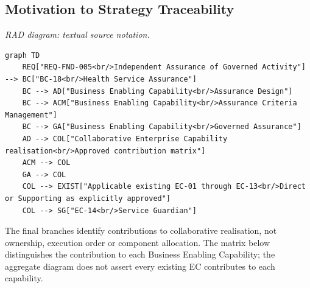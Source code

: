 \subsection*{Motivation to Strategy Traceability}
\label{rad:assurance-strategy:28}

\textit{RAD diagram: textual source notation.}
\begin{Verbatim}[breaklines,fontsize=\footnotesize]
graph TD
    REQ["REQ-FND-005<br/>Independent Assurance of Governed Activity"] --> BC["BC-18<br/>Health Service Assurance"]
    BC --> AD["Business Enabling Capability<br/>Assurance Design"]
    BC --> ACM["Business Enabling Capability<br/>Assurance Criteria Management"]
    BC --> GA["Business Enabling Capability<br/>Governed Assurance"]
    AD --> COL["Collaborative Enterprise Capability realisation<br/>Approved contribution matrix"]
    ACM --> COL
    GA --> COL
    COL --> EXIST["Applicable existing EC-01 through EC-13<br/>Direct or Supporting as explicitly approved"]
    COL --> SG["EC-14<br/>Service Guardian"]
\end{Verbatim}
\label{rad:assurance-strategy:41}

The final branches identify contributions to collaborative realisation, not ownership, execution order or component allocation. The matrix below distinguishes the contribution to each Business Enabling Capability; the aggregate diagram does not assert every existing EC contributes to each capability.

